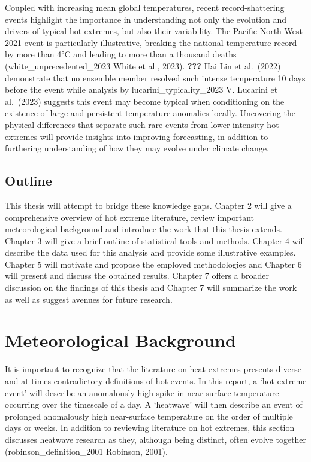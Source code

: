 \documentclass[11pt,a4paper,twoside,openright]{report}
\theoremstyle{definition}
\begin{document}
Coupled with increasing mean global temperatures, recent record-shattering events highlight the importance in understanding not only the evolution and drivers of typical hot extremes, but also their variability. The Pacific North-West 2021 event is particularly illustrative, breaking the national temperature record by more than 4°C and leading to more than a thousand deaths (white\_unprecedented\_2023 White et al., 2023). \textbf{???} Hai Lin et al.~(2022) demonstrate that no ensemble member resolved such intense temperature 10 days before the event while analysis by lucarini\_typicality\_2023 V. Lucarini et al.~(2023) suggests this event may become typical when conditioning on the existence of large and persistent temperature anomalies locally. Uncovering the physical differences that separate such rare events from lower-intensity hot extremes will provide insights into improving forecasting, in addition to furthering understanding of how they may evolve under climate change.

\section{Outline}\label{outline}

This thesis will attempt to bridge these knowledge gaps. Chapter 2 will give a comprehensive overview of hot extreme literature, review important meteorological background and introduce the work that this thesis extends. Chapter 3 will give a brief outline of statistical tools and methods. Chapter 4 will describe the data used for this analysis and provide some illustrative examples. Chapter 5 will motivate and propose the employed methodologies and Chapter 6 will present and discuss the obtained results. Chapter 7 offers a broader discussion on the findings of this thesis and Chapter 7 will summarize the work as well as suggest avenues for future research.

\chapter{Meteorological Background}\label{meteorological-background}

It is important to recognize that the literature on heat extremes presents diverse and at times contradictory definitions of hot events. In this report, a `hot extreme event' will describe an anomalously high spike in near-surface temperature occurring over the timescale of a day. A `heatwave' will then describe an event of prolonged anomalously high near-surface temperature on the order of multiple days or weeks. In addition to reviewing literature on hot extremes, this section discusses heatwave research as they, although being distinct, often evolve together (robinson\_definition\_2001 Robinson, 2001).
\end{document}
